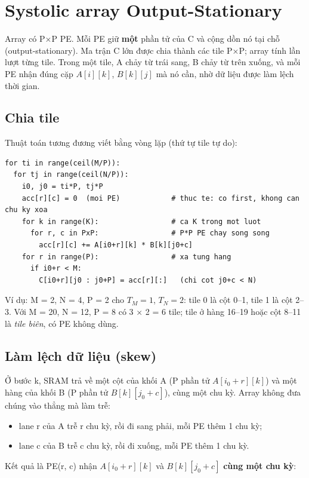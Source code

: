 \documentclass[10pt,a4paper]{article}
\begin{document}
\section{Systolic array Output-Stationary}\label{sec:5}

\begin{keypoint}
Array có P×P PE. Mỗi PE giữ \textbf{một} phần tử của C và cộng dồn nó tại chỗ (output-stationary). Ma trận C lớn được chia thành các tile P×P; array tính lần lượt từng tile. Trong một tile, A chảy từ trái sang, B chảy từ trên xuống, và mỗi PE nhận đúng cặp $A[i][k]$, $B[k][j]$ mà nó cần, nhờ dữ liệu được làm lệch thời gian.
\end{keypoint}

\subsection{Chia tile}
\eqbox{\[
T_M = \Big\lceil \frac{M}{P} \Big\rceil,\quad T_N = \Big\lceil \frac{N}{P} \Big\rceil, \qquad
\text{tile } (t_i, t_j) \text{ phủ } i \in [i_0, i_0+P),\ j \in [j_0, j_0+P),\ i_0 = t_i P,\ j_0 = t_j P.
\]}
Thuật toán tương đương viết bằng vòng lặp (thứ tự tile tự do):
\begin{Verbatim}[frame=leftline,framerule=2pt,rulecolor=\color{brand},xleftmargin=6pt,samepage=true]
for ti in range(ceil(M/P)):
  for tj in range(ceil(N/P)):
    i0, j0 = ti*P, tj*P
    acc[r][c] = 0  (moi PE)            # thuc te: co first, khong can chu ky xoa
    for k in range(K):                 # ca K trong mot luot
      for r, c in PxP:                 # P*P PE chay song song
        acc[r][c] += A[i0+r][k] * B[k][j0+c]
    for r in range(P):                 # xa tung hang
      if i0+r < M:
        C[i0+r][j0 : j0+P] = acc[r][:]   (chi cot j0+c < N)
\end{Verbatim}
Ví dụ: M = 2, N = 4, P = 2 cho $T_M = 1$, $T_N = 2$: tile 0 là cột 0–1, tile 1 là cột 2–3. Với M = 20, N = 12, P = 8 có 3 × 2 = 6 tile; tile ở hàng 16–19 hoặc cột 8–11 là \emph{tile biên}, có PE không dùng.

\subsection{Làm lệch dữ liệu (skew)}
Ở bước k, SRAM trả về một cột của khối A (P phần tử $A[i_0+r][k]$) và một hàng của khối B (P phần tử $B[k][j_0+c]$), cùng một chu kỳ. Array không đưa chúng vào thẳng mà làm trễ:
\begin{itemize}
\item lane r của A trễ r chu kỳ, rồi đi sang phải, mỗi PE thêm 1 chu kỳ;
\item lane c của B trễ c chu kỳ, rồi đi xuống, mỗi PE thêm 1 chu kỳ.
\end{itemize}
Kết quả là PE(r, c) nhận $A[i_0+r][k]$ và $B[k][j_0+c]$ \textbf{cùng một chu kỳ}:
\eqbox{\[
t_{r,c}(k) = t_0 + k + r + c.
\]}
\end{document}

